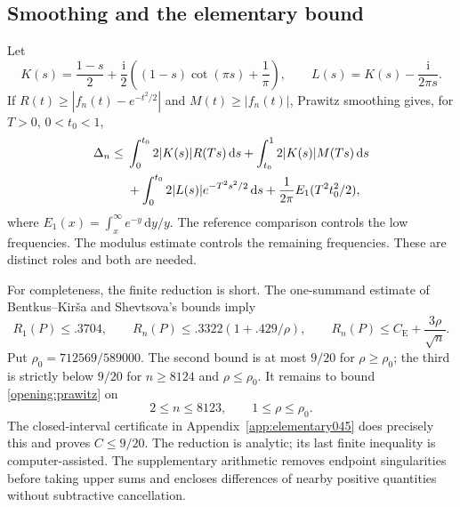 \documentclass[11pt,a4paper]{article}
\numberwithin{equation}{section}
\theoremstyle{definition}
\theoremstyle{remark}
\newcommand{\ii}{\mathrm i}
\newcommand{\dd}{\,\mathrm d}
\newcommand{\CE}{C_{\mathrm E}}
\begin{document}
\subsection{Smoothing and the elementary bound}
Let
\[
 K(s)=\frac{1-s}{2}+\frac{\ii}{2}
 \left((1-s)\cot(\pi s)+\frac1\pi\right),\qquad
 L(s)=K(s)-\frac{\ii}{2\pi s}.
\]
If \(R(t)\ge|f_n(t)-e^{-t^2/2}|\) and \(M(t)\ge|f_n(t)|\),
Prawitz smoothing \cite{Prawitz1972} gives, for \(T>0\), \(0<t_0<1\),
\begin{align}\label{opening:prawitz}
 \Delta_n\le{}&\int_0^{t_0}2|K(s)|R(Ts)\dd s
 +\int_{t_0}^1 2|K(s)|M(Ts)\dd s\notag\\
 &+\int_0^{t_0}2|L(s)|e^{-T^2s^2/2}\dd s
 +\frac1{2\pi}E_1(T^2t_0^2/2),
\end{align}
where \(E_1(x)=\int_x^\infty e^{-y}\dd y/y\).
The reference comparison controls the low frequencies. The modulus
estimate controls the remaining frequencies. These are distinct
roles and both are needed.

For completeness, the finite reduction is short. The one-summand
estimate of Bentkus--Kir\v{s}a \cite{BentkusKirsa1989} and Shevtsova's
bounds \cite{Shevtsova2013,Shevtsova2012} imply
\[
 R_1(P)\le .3704,\qquad
 R_n(P)\le .3322(1+.429/\rho),\qquad
 R_n(P)\le\CE+\frac{3\rho}{\sqrt n}.
\]
Put \(\rho_0=712569/589000\). The second bound is at most \(9/20\)
for \(\rho\ge\rho_0\); the third is strictly below \(9/20\) for
\(n\ge8124\) and \(\rho\le\rho_0\). It remains to bound
\eqref{opening:prawitz} on
\[
 2\le n\le8123,\qquad 1\le\rho\le\rho_0.
\]
The closed-interval certificate in Appendix~\ref{app:elementary045}
does precisely this and proves \(C\le9/20\).
The reduction is analytic; its last finite inequality is
computer-assisted. The supplementary arithmetic removes endpoint
singularities before taking upper sums and encloses differences of
nearby positive quantities without subtractive cancellation.
\end{document}
